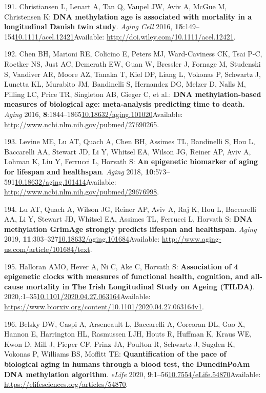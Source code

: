 \documentclass[
]{book}
\begin{document}
\leavevmode\hypertarget{ref-Christiansen2016}{}%
191. Christiansen L, Lenart A, Tan Q, Vaupel JW, Aviv A, McGue M, Christensen K: \textbf{DNA methylation age is associated with mortality in a longitudinal Danish twin study}. \emph{Aging Cell} 2016, \textbf{15}:149--154\href{https://doi.org/10.1111/acel.12421}{10.1111/acel.12421}Available: \url{http://doi.wiley.com/10.1111/acel.12421}.

\leavevmode\hypertarget{ref-Chen2016a}{}%
192. Chen BH, Marioni RE, Colicino E, Peters MJ, Ward-Caviness CK, Tsai P-C, Roetker NS, Just AC, Demerath EW, Guan W, Bressler J, Fornage M, Studenski S, Vandiver AR, Moore AZ, Tanaka T, Kiel DP, Liang L, Vokonas P, Schwartz J, Lunetta KL, Murabito JM, Bandinelli S, Hernandez DG, Melzer D, Nalls M, Pilling LC, Price TR, Singleton AB, Gieger C, et al.: \textbf{DNA methylation-based measures of biological age: meta-analysis predicting time to death.} \emph{Aging} 2016, \textbf{8}:1844--1865\href{https://doi.org/10.18632/aging.101020}{10.18632/aging.101020}Available: \url{http://www.ncbi.nlm.nih.gov/pubmed/27690265}.

\leavevmode\hypertarget{ref-Levine2018}{}%
193. Levine ME, Lu AT, Quach A, Chen BH, Assimes TL, Bandinelli S, Hou L, Baccarelli AA, Stewart JD, Li Y, Whitsel EA, Wilson JG, Reiner AP, Aviv A, Lohman K, Liu Y, Ferrucci L, Horvath S: \textbf{An epigenetic biomarker of aging for lifespan and healthspan}. \emph{Aging} 2018, \textbf{10}:573--591\href{https://doi.org/10.18632/aging.101414}{10.18632/aging.101414}Available: \url{http://www.ncbi.nlm.nih.gov/pubmed/29676998}.

\leavevmode\hypertarget{ref-Lu2019}{}%
194. Lu AT, Quach A, Wilson JG, Reiner AP, Aviv A, Raj K, Hou L, Baccarelli AA, Li Y, Stewart JD, Whitsel EA, Assimes TL, Ferrucci L, Horvath S: \textbf{DNA methylation GrimAge strongly predicts lifespan and healthspan}. \emph{Aging} 2019, \textbf{11}:303--327\href{https://doi.org/10.18632/aging.101684}{10.18632/aging.101684}Available: \url{http://www.aging-us.com/article/101684/text}.

\leavevmode\hypertarget{ref-Halloran2020}{}%
195. Halloran AMO, Hever A, Ni C, Ake C, Horvath S: \textbf{Association of 4 epigenetic clocks with measures of functional health, cognition, and all- cause mortality in The Irish Longitudinal Study on Ageing (TILDA)}. 2020,:1--35\href{https://doi.org/10.1101/2020.04.27.063164}{10.1101/2020.04.27.063164}Available: \url{https://www.biorxiv.org/content/10.1101/2020.04.27.063164v1}.

\leavevmode\hypertarget{ref-Belsky2020}{}%
196. Belsky DW, Caspi A, Arseneault L, Baccarelli A, Corcoran DL, Gao X, Hannon E, Harrington HL, Rasmussen LJH, Houts R, Huffman K, Kraus WE, Kwon D, Mill J, Pieper CF, Prinz JA, Poulton R, Schwartz J, Sugden K, Vokonas P, Williams BS, Moffitt TE: \textbf{Quantification of the pace of biological aging in humans through a blood test, the DunedinPoAm DNA methylation algorithm}. \emph{eLife} 2020, \textbf{9}:1--56\href{https://doi.org/10.7554/eLife.54870}{10.7554/eLife.54870}Available: \url{https://elifesciences.org/articles/54870}.
\end{document}
